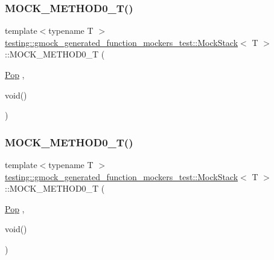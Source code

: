 \mbox{\label{classtesting_1_1gmock__generated__function__mockers__test_1_1_mock_stack_a5e55ffb22e7f11c6940a97bd001bd50c}} 
\subsubsection{\texorpdfstring{MOCK\_METHOD0\_T()}{MOCK\_METHOD0\_T()}\hspace{0.1cm}{\footnotesize\ttfamily [2/6]}}
{\footnotesize\ttfamily template$<$typename T $>$ \\
\mbox{\hyperlink{classtesting_1_1gmock__generated__function__mockers__test_1_1_mock_stack}{testing\+::gmock\+\_\+generated\+\_\+function\+\_\+mockers\+\_\+test\+::\+Mock\+Stack}}$<$ T $>$\+::M\+O\+C\+K\+\_\+\+M\+E\+T\+H\+O\+D0\+\_\+T (\begin{DoxyParamCaption}\item[{\mbox{\hyperlink{classtesting_1_1gmock__generated__function__mockers__test_1_1_stack_interface_a1a6646d1d9febe90c607b9b3e4539b67}{Pop}}}]{,  }\item[{void()}]{ }\end{DoxyParamCaption})}

\mbox{\label{classtesting_1_1gmock__generated__function__mockers__test_1_1_mock_stack_a5e55ffb22e7f11c6940a97bd001bd50c}} 
\subsubsection{\texorpdfstring{MOCK\_METHOD0\_T()}{MOCK\_METHOD0\_T()}\hspace{0.1cm}{\footnotesize\ttfamily [3/6]}}
{\footnotesize\ttfamily template$<$typename T $>$ \\
\mbox{\hyperlink{classtesting_1_1gmock__generated__function__mockers__test_1_1_mock_stack}{testing\+::gmock\+\_\+generated\+\_\+function\+\_\+mockers\+\_\+test\+::\+Mock\+Stack}}$<$ T $>$\+::M\+O\+C\+K\+\_\+\+M\+E\+T\+H\+O\+D0\+\_\+T (\begin{DoxyParamCaption}\item[{\mbox{\hyperlink{classtesting_1_1gmock__generated__function__mockers__test_1_1_stack_interface_a1a6646d1d9febe90c607b9b3e4539b67}{Pop}}}]{,  }\item[{void()}]{ }\end{DoxyParamCaption})}

